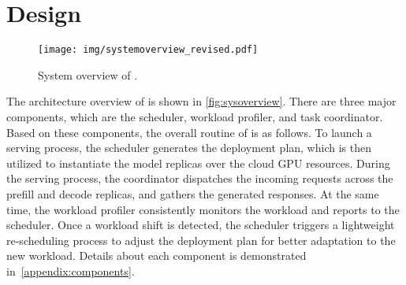 \section{\sys Design}
\label{sec:sys_design}

\begin{figure}[!t]
  \centering
  \texttt{[image: img/systemoverview\_revised.pdf]} %
  \vspace{-1em}
  \caption{System overview of \sys.}
  \label{fig:sysoverview}
  \vspace{-1em}
\end{figure}


The architecture overview of \sys is shown in \autoref{fig:sysoverview}. There are three major components, which are the scheduler, workload profiler, and task coordinator. Based on these components, the overall routine of \sys is as follows.
 To launch a serving process, the scheduler generates the deployment plan, which is then utilized to instantiate the model replicas over the cloud GPU resources. 
 During the serving process, the coordinator dispatches the incoming requests across the prefill and decode replicas, and gathers the generated responses. 
 At the same time, the workload profiler consistently monitors the workload and reports to the scheduler. 
 Once a workload shift is detected, the scheduler triggers a lightweight re-scheduling process to adjust the deployment plan for better adaptation to the new workload. Details about each component is demonstrated in~\autoref{appendix:components}.